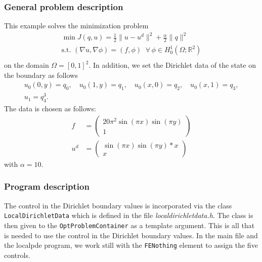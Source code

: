 \subsubsection{General problem description}
This example solves the minimization problem
\begin{gather*}
\min J(q,u) = \frac{1}{2} \|u-u^d\|^2 + \frac{\alpha}{2}\|q\|^2\\
\text{s.t. } (\nabla u,\nabla \phi) = (f,\phi)\;\;\forall\,\phi \in H^1_0(\Omega; \mathbb R^2)\\
\end{gather*}
on the domain $\Omega = [0,1]^2$. In addition, we set the Dirichlet data of the state on the boundary as follows
\begin{gather*}
 u_0(0,y) = q_0,\quad u_0(1,y) = q_1,\quad u_0(x,0) = q_2,\quad u_0(x,1) = q_3,\\
 u_1 = q_4^3.
\end{gather*}
The data is chosen as follows:
\begin{align*}
 f &= \left(\begin{matrix}20\pi^2  \sin( \pi x) \sin(\pi y)\\1 \end{matrix}\right)\\
 u^d&= \left(\begin{matrix}\sin( \pi x) \sin(\pi y)*x\\x \end{matrix}\right)
\end{align*}
with $\alpha = 10$.
\subsubsection{Program description}
The control in the Dirichlet boundary values is incorporated via the
class \texttt{LocalDirichletData} which is defined in the
file \textit{localdirichletdata.h}. The class is then given to
the \texttt{OptProblemContainer} as a template argument. This is all that is
needed to use the control in the Dirichlet boundary values. 
In the main file and the localpde program, we work still with the 
\texttt{FE\underline{}Nothing} element to assign the five controls.

